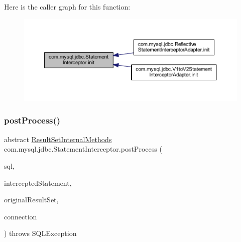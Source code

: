 Here is the caller graph for this function\+:
\nopagebreak
\begin{figure}[H]
\begin{center}
\leavevmode
\includegraphics[width=350pt]{interfacecom_1_1mysql_1_1jdbc_1_1_statement_interceptor_a985c3d5d0c9b9694cfb73ba92273409e_icgraph}
\end{center}
\end{figure}
\mbox{\label{interfacecom_1_1mysql_1_1jdbc_1_1_statement_interceptor_a09f86aac8aebe5751a6f920e42d2d9b4}} 
\subsubsection{\texorpdfstring{post\+Process()}{postProcess()}}
{\footnotesize\ttfamily abstract \mbox{\hyperlink{interfacecom_1_1mysql_1_1jdbc_1_1_result_set_internal_methods}{Result\+Set\+Internal\+Methods}} com.\+mysql.\+jdbc.\+Statement\+Interceptor.\+post\+Process (\begin{DoxyParamCaption}\item[{String}]{sql,  }\item[{\mbox{\hyperlink{interfacecom_1_1mysql_1_1jdbc_1_1_statement}{Statement}}}]{intercepted\+Statement,  }\item[{\mbox{\hyperlink{interfacecom_1_1mysql_1_1jdbc_1_1_result_set_internal_methods}{Result\+Set\+Internal\+Methods}}}]{original\+Result\+Set,  }\item[{\mbox{\hyperlink{interfacecom_1_1mysql_1_1jdbc_1_1_connection}{Connection}}}]{connection }\end{DoxyParamCaption}) throws S\+Q\+L\+Exception\hspace{0.3cm}{\ttfamily [abstract]}}

